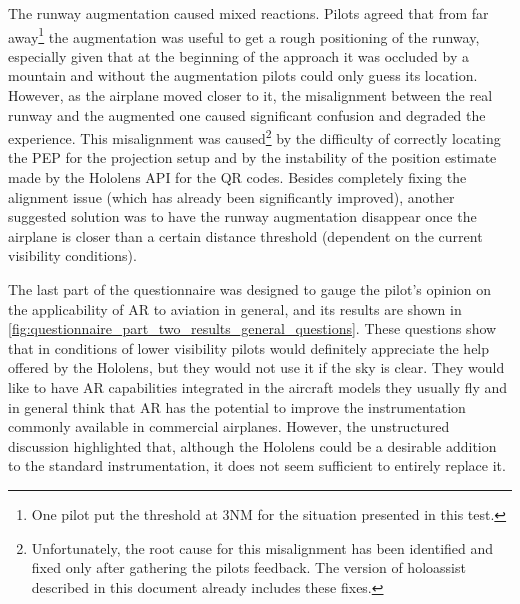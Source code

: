 The runway augmentation caused mixed reactions. Pilots agreed that from far away\footnote{One pilot put the threshold at $3$NM for the situation presented in this test.} the augmentation was useful to get a rough positioning of the runway, especially given that at the beginning of the approach it was occluded by a mountain and without the augmentation pilots could only guess its location. However, as the airplane moved closer to it, the misalignment between the real runway and the augmented one caused significant confusion and degraded the experience. This misalignment was caused\footnote{Unfortunately, the root cause for this misalignment has been identified and fixed only after gathering the pilots feedback. The version of \gls{holoassist} described in this document already includes these fixes.} by the difficulty of correctly locating the \gls{PEP} for the projection setup and by the instability of the position estimate made by the Hololens \gls{API} for the QR codes. Besides completely fixing the alignment issue (which has already been significantly improved), another suggested solution was to have the runway augmentation disappear once the airplane is closer than a certain distance threshold (dependent on the current visibility conditions).

The last part of the questionnaire was designed to gauge the pilot's opinion on the applicability of \gls{AR} to aviation in general, and its results are shown in \autoref{fig:questionnaire_part_two_results_general_questions}. These questions show that in conditions of lower visibility pilots would definitely appreciate the help offered by the Hololens, but they would not use it if the sky is clear. They would like to have \gls{AR} capabilities integrated in the aircraft models they usually fly and in general think that \gls{AR} has the potential to improve the instrumentation commonly available in commercial airplanes. However, the unstructured discussion highlighted that, although the Hololens could be a desirable addition to the standard instrumentation, it does not seem sufficient to entirely replace it.


